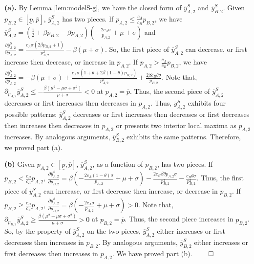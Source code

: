 \documentclass[nonblindrev,copyedit]{informs1}
\begin{document}
\begin{APPENDICES}
{\bf (a). } By Lemma \ref{lem:modelS-g}, we have the closed form of $\overline{y}^S_{A,2}$ and $\overline{y}^S_{B,2}$. Given $p_{B,2} \in [\underline{p}, \overline{p}]$, $\overline{y}^S_{A,2}$ has two pieces. If $p_{A,2} \leq \frac{c_A}{c_B}p_{B,2}$, we have $\overline{y}^S_{A,2} = ( \frac{1}{2}+\beta p_{B,2}-\beta p_{A,2}) (-\frac{2 c_A \sigma }{p_{A,2}}+\mu +\sigma )$ and $\frac{\partial \overline{y}^S_{A,2}}{\partial p_{A,2}} = \frac{c_A \sigma  (2 \beta p_{B,2}+1)}{p_{A,2}^2}-\beta  (\mu +\sigma )$. So, the first piece of $\overline{y}^S_{A,2}$ can decrease, or first increase then decrease, or increase in $p_{A,2}$.
If $p_{A,2} > \frac{c_A}{c_B}p_{B,2}$, we have $\frac{\partial \overline{y}^S_{A,2}}{\partial p_{A,2}} = -\beta  (\mu +\sigma )+\frac{c_A \sigma  (1+\theta +2 \beta  (1-\theta) p_{B,2})}{p_{A,2}^2}+\frac{2 \beta c_B \theta  \sigma }{p_{B,2}}$.
Note that, $\partial_{p_{A,2}} \overline{y}^S_{A,2} \leq -\frac{\beta(\mu^2 - \mu \sigma + \sigma^2)}{\mu + \sigma} < 0$ at $p_{A,2} = \overline{p}$. Thus, the second piece of $\overline{y}^S_{A,2}$ decreases or first increases then decreases in $p_{A,2}$. Thus, $\overline{y}^S_{A,2}$ exhibits four possible patterns: $\overline{y}^S_{A,2}$ decreases or first increases then decreases or first decreases then increases then decreases in $p_{A,2}$ or presents two interior local maxima as $p_{A,2}$ increases.
By analogous arguments, $\overline{y}^S_{B,2}$ exhibits the same patterns. Therefore, we proved part (a).

{\bf (b)} Given $p_{A,2} \in [\underline{p}, \overline{p}]$, $\overline{y}^S_{A,2}$, as a function of $p_{B,2}$, has two pieces. If $p_{B,2} < \frac{c_B}{c_A}p_{A,2}$, $\frac{\partial \overline{y}^S_{A,2}}{\partial p_{B,2}} = \beta  \left(-\frac{2 c_A (1-\theta) \sigma }{p_{A,2}}+\mu +\sigma \right)-\frac{2 c_B \beta \theta  p_{A,2} \sigma }{p_{B,2}^2}-\frac{c_B \theta  \sigma }{p_{B,2}^2}$. Thus, the first piece of $\overline{y}^S_{A,2}$ can increase, or first decrease then increase, or decrease in $p_{B,2}$. If $p_{B,2} \geq \frac{c_B}{c_A}p_{A,2}$, $\frac{\partial \overline{y}^S_{A,2}}{\partial p_{B,2}} = \beta  \left(-\frac{2 c_A \sigma }{p_{A,2}}+\mu +\sigma \right) >0$. Note that, $\partial_{p_{B,2}} \overline{y}^S_{A,2} \geq \frac{\beta(\mu^2 - \mu \sigma + \sigma^2)}{\mu + \sigma} > 0$ at $p_{B,2} = \overline{p}$. Thus, the second piece increases in $p_{B,2}$.
So, by the property of $\overline{y}^S_{A,2}$ on the two pieces, $\overline{y}^S_{A,2}$ either increases or first decreases then increases in $p_{B,2}$. By analogous arguments, $\overline{y}^S_{B,2}$ either increases or first decreases then increases in $p_{A,2}$. We have proved part (b). $\qed$


\end{APPENDICES}
\end{document}
